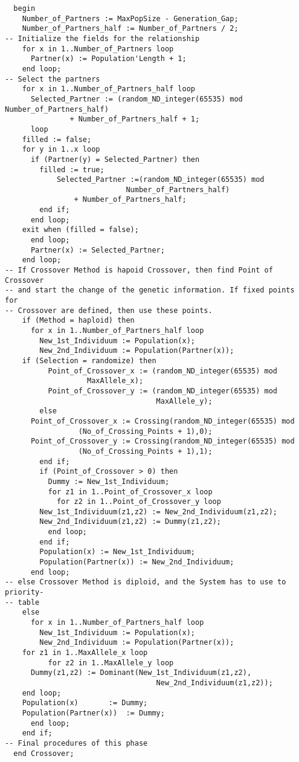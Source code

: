 \begin{verbatim}
  begin
    Number_of_Partners := MaxPopSize - Generation_Gap;
    Number_of_Partners_half := Number_of_Partners / 2;
-- Initialize the fields for the relationship
    for x in 1..Number_of_Partners loop
      Partner(x) := Population'Length + 1;
    end loop;
-- Select the partners
    for x in 1..Number_of_Partners_half loop
      Selected_Partner := (random_ND_integer(65535) mod Number_of_Partners_half)
			   + Number_of_Partners_half + 1;
      loop
	filled := false;
	for y in 1..x loop
	  if (Partner(y) = Selected_Partner) then
	    filled := true;
            Selected_Partner :=(random_ND_integer(65535) mod
	    					Number_of_Partners_half)
				+ Number_of_Partners_half;
	    end if;
	  end loop;
	exit when (filled = false);
      end loop;
      Partner(x) := Selected_Partner;
    end loop;
-- If Crossover Method is hapoid Crossover, then find Point of Crossover 
-- and start the change of the genetic information. If fixed points for
-- Crossover are defined, then use these points.
    if (Method = haploid) then
      for x in 1..Number_of_Partners_half loop
        New_1st_Individuum := Population(x);
        New_2nd_Individuum := Population(Partner(x));
	if (Selection = randomize) then
          Point_of_Crossover_x := (random_ND_integer(65535) mod 
			 	   MaxAllele_x);
          Point_of_Crossover_y := (random_ND_integer(65535) mod
                                   MaxAllele_y);
        else
	  Point_of_Crossover_x := Crossing(random_ND_integer(65535) mod 
				 (No_of_Crossing_Points + 1),0);
	  Point_of_Crossover_y := Crossing(random_ND_integer(65535) mod 
				 (No_of_Crossing_Points + 1),1);
        end if;
        if (Point_of_Crossover > 0) then
          Dummy := New_1st_Individuum;
          for z1 in 1..Point_of_Crossover_x loop
            for z2 in 1..Point_of_Crossover_y loop
	    New_1st_Individuum(z1,z2) := New_2nd_Individuum(z1,z2);
	    New_2nd_Individuum(z1,z2) := Dummy(z1,z2);
          end loop;
        end if;
        Population(x) := New_1st_Individuum;
        Population(Partner(x)) := New_2nd_Individuum;
      end loop;
-- else Crossover Method is diploid, and the System has to use to priority-
-- table
    else
      for x in 1..Number_of_Partners_half loop
        New_1st_Individuum := Population(x);
        New_2nd_Individuum := Population(Partner(x));
	for z1 in 1..MaxAllele_x loop
          for z2 in 1..MaxAllele_y loop
	  Dummy(z1,z2) := Dominant(New_1st_Individuum(z1,z2),
                                   New_2nd_Individuum(z1,z2));
	end loop;
	Population(x)		:= Dummy;
	Population(Partner(x))	:= Dummy;
      end loop;
    end if;
-- Final procedures of this phase
  end Crossover;


\end{verbatim}
